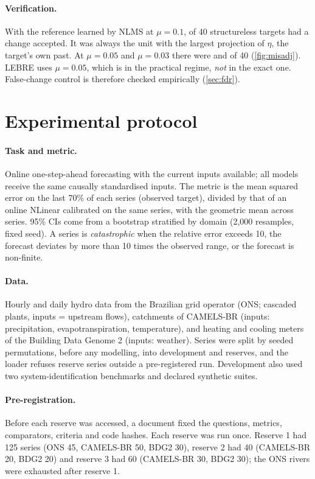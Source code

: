 \documentclass[11pt]{article}
\theoremstyle{remark}
\begin{document}
\paragraph{Verification.} With the reference learned by NLMS at $\mu=0.1$, \misAccA{} of 40 structureless targets had a change accepted. It was always the unit with the largest projection of $\eta$, the target's own past. At $\mu=0.05$ and $\mu=0.03$ there were \misAccB{} and \misAccC{} of 40 (\cref{fig:misadj}). LEBRE uses $\mu=0.05$, which is in the practical regime, \emph{not} in the exact one. False-change control is therefore checked empirically (\cref{sec:fdr}).

\section{Experimental protocol}\label{sec:protocol}

\paragraph{Task and metric.} Online one-step-ahead forecasting with the current inputs available; all models receive the same causally standardised inputs. The metric is the mean squared error on the last 70\% of each series (observed target), divided by that of an online NLinear calibrated on the same series, with the geometric mean across series. 95\% CIs come from a bootstrap stratified by domain (2{,}000 resamples, fixed seed). A series is \emph{catastrophic} when the relative error exceeds 10, the forecast deviates by more than 10 times the observed range, or the forecast is non-finite.

\paragraph{Data.} Hourly and daily hydro data from the Brazilian grid operator (ONS; cascaded plants, inputs = upstream flows), catchments of CAMELS-BR \citep{chagas2020camels} (inputs: precipitation, evapotranspiration, temperature), and heating and cooling meters of the Building Data Genome 2 \citep{miller2020bdg2} (inputs: weather). Series were split by seeded permutations, before any modelling, into development and reserves, and the loader refuses reserve series outside a pre-registered run. Development also used two system-identification benchmarks and declared synthetic suites.

\paragraph{Pre-registration.} Before each reserve was accessed, a document fixed the questions, metrics, comparators, criteria and code hashes. Each reserve was run once. Reserve 1 had 125 series (ONS 45, CAMELS-BR 50, BDG2 30), reserve 2 had 40 (CAMELS-BR 20, BDG2 20) and reserve 3 had 60 (CAMELS-BR 30, BDG2 30); the ONS rivers were exhausted after reserve 1.
\end{document}
